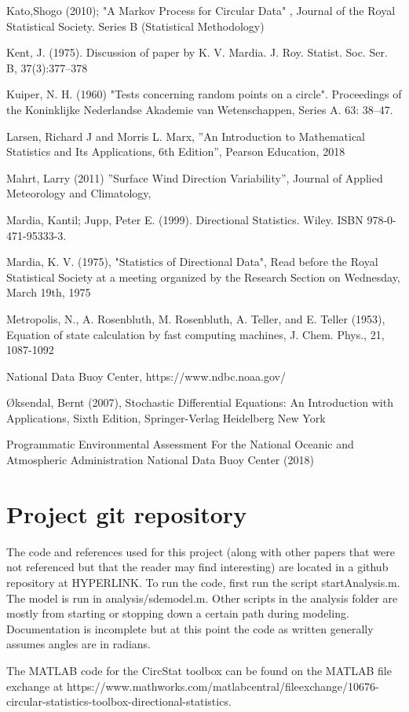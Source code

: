 \documentclass[12pt]{article}
\numberwithin{equation}{section}
\numberwithin{figure}{section}
\begin{document}
\begin{thebibliography}{1}
 Kato,Shogo (2010); "A Markov Process for Circular Data" , Journal of the Royal Statistical Society. Series B (Statistical Methodology)

 Kent, J. (1975). Discussion of paper by K. V. Mardia. J. Roy. Statist. Soc. Ser. B, 37(3):377–378

 Kuiper, N. H. (1960) "Tests concerning random points on a circle". Proceedings of the Koninklijke Nederlandse Akademie van Wetenschappen, Series A. 63: 38–47.

Larsen, Richard J and Morris L. Marx, ''An Introduction to Mathematical Statistics and Its Applications, 6th Edition'', Pearson Education, 2018

 Mahrt, Larry (2011) ''Surface Wind Direction Variability'',  Journal of Applied Meteorology and Climatology, 

Mardia, Kantil; Jupp, Peter E. (1999). Directional Statistics. Wiley. ISBN 978-0-471-95333-3.

 Mardia, K. V. (1975), "Statistics of Directional Data", Read before the Royal Statistical Society at a meeting organized by the Research Section on Wednesday, March 19th, 1975

Metropolis, N., A.  Rosenbluth, M.  Rosenbluth, A.  Teller, and E. Teller (1953), Equation of state calculation by fast computing machines, J. Chem. Phys., 21, 1087-1092

 National Data Buoy Center, https://www.ndbc.noaa.gov/

 Øksendal, Bernt (2007), Stochastic Differential Equations: An Introduction with Applications, Sixth Edition, Springer-Verlag Heidelberg New York

 Programmatic Environmental Assessment For the National Oceanic and Atmospheric Administration National Data Buoy Center (2018)  
\end{thebibliography}

\appendix
\section{Project git repository}
The code and references used for this project (along with other papers that were not referenced but that the reader may find interesting) are located in a github repository at HYPERLINK. To run the code, first run the script startAnalysis.m. The model is run in analysis/sdemodel.m. Other scripts in the analysis folder are mostly from starting or stopping down a certain path during modeling. Documentation is incomplete but at this point the code as written generally assumes angles are in radians. 

 The MATLAB code for the CircStat toolbox can be found on the MATLAB file exchange at https://www.mathworks.com/matlabcentral/fileexchange/10676-circular-statistics-toolbox-directional-statistics.
\end{document}
